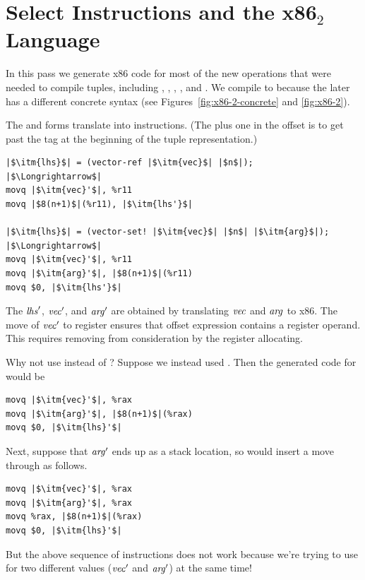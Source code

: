 \documentclass[11pt]{book}
\begin{document}
\section{Select Instructions and the x86$_2$ Language}
\label{sec:select-instructions-gc}


In this pass we generate x86 code for most of the new operations that
were needed to compile tuples, including ,
, , , and
. We compile  to  because
the later has a different concrete syntax (see
Figures~\ref{fig:x86-2-concrete} and \ref{fig:x86-2}).

The  and  forms translate into
 instructions.  (The plus one in the offset is to get past
the tag at the beginning of the tuple representation.)
\begin{lstlisting}
|$\itm{lhs}$| = (vector-ref |$\itm{vec}$| |$n$|);
|$\Longrightarrow$|
movq |$\itm{vec}'$|, %r11
movq |$8(n+1)$|(%r11), |$\itm{lhs'}$|

|$\itm{lhs}$| = (vector-set! |$\itm{vec}$| |$n$| |$\itm{arg}$|);
|$\Longrightarrow$|
movq |$\itm{vec}'$|, %r11
movq |$\itm{arg}'$|, |$8(n+1)$|(%r11)
movq $0, |$\itm{lhs'}$|
\end{lstlisting}
The $\mathit{lhs}'$, $\mathit{vec}'$, and $\mathit{arg}'$ are obtained by
translating $\mathit{vec}$ and $\mathit{arg}$ to x86.  The move of $\mathit{vec}'$ to
register  ensures that offset expression
 contains a register operand.  This requires
removing  from consideration by the register allocating.

Why not use  instead of ? Suppose we instead used
. Then the generated code for  would be
\begin{lstlisting}
movq |$\itm{vec}'$|, %rax
movq |$\itm{arg}'$|, |$8(n+1)$|(%rax)
movq $0, |$\itm{lhs}'$|
\end{lstlisting}
Next, suppose that $\mathit{arg}'$ ends up as a stack location, so
 would insert a move through 
as follows.
\begin{lstlisting}
movq |$\itm{vec}'$|, %rax
movq |$\itm{arg}'$|, %rax
movq %rax, |$8(n+1)$|(%rax)
movq $0, |$\itm{lhs}'$|
\end{lstlisting}
But the above sequence of instructions does not work because we're
trying to use  for two different values ($\mathit{vec}'$ and
$\mathit{arg}'$) at the same time!
\end{document}
